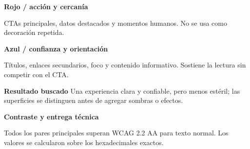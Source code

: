 \documentclass[10pt]{article}
\begin{document}
\begin{minipage}[t]{0.485\linewidth}
  \begin{tcolorbox}[colback=asohRedSoft, colframe=asohRedSoft, boxrule=0pt,
    sharp corners, height=36mm, left=5mm, right=5mm, top=5mm]
    {\small\bfseries\color{asohPrimaryDark}Rojo / acción y cercanía}\par\vspace{3pt}
    {\scriptsize\color{asohText}CTAs principales, datos destacados y momentos humanos. No se usa como decoración repetida.}
  \end{tcolorbox}
\end{minipage}\hfill
\begin{minipage}[t]{0.485\linewidth}
  \begin{tcolorbox}[colback=asohBlueSoft, colframe=asohBlueSoft, boxrule=0pt,
    sharp corners, height=36mm, left=5mm, right=5mm, top=5mm]
    {\small\bfseries\color{asohSecondaryDark}Azul / confianza y orientación}\par\vspace{3pt}
    {\scriptsize\color{asohText}Títulos, enlaces secundarios, foco y contenido informativo. Sostiene la lectura sin competir con el CTA.}
  \end{tcolorbox}
\end{minipage}

\vspace{9pt}
\begin{tcolorbox}[colback=asohSurface, colframe=asohBorderWarm, boxrule=0.45pt,
  sharp corners, left=5mm, right=5mm, top=4mm, bottom=4mm]
  {\small\bfseries\color{asohSecondaryDark}Resultado buscado}\hspace{5pt}
  {\small\color{asohTextSecondary}Una experiencia clara y confiable, pero menos estéril; las superficies se distinguen antes de agregar sombras o efectos.}
\end{tcolorbox}

\newpage

{\fontsize{23}{26}\selectfont\bfseries\color{asohSecondaryDark}Contraste y entrega técnica}\par
\vspace{4pt}
{\small\color{asohTextSecondary}Todos los pares principales superan WCAG 2.2 AA para texto normal. Los valores se calcularon sobre los hexadecimales exactos.}\par
{}\vspace{10pt}
\end{document}
